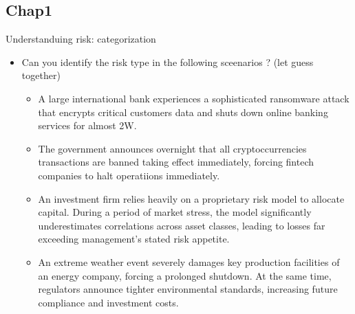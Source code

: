\documentclass[aspectratio=169, 10pt]{beamer} %
\begin{document}
\subsection{Chap1}
\begin{frame}{Understanduing risk: categorization}
    \begin{itemize}

                 \item [$\bullet$] Can you identify the risk type in the following sceenarios ? 
                 (let guess together) 
    \begin{itemize}
        \item [$\bullet$] A large international bank experiences a sophisticated ransomware attack
        that encrypts critical customers data and shuts down online banking services for almost 2W. 
         \medskip 
          \item [$\bullet$] The government announces overnight that all cryptoccurrencies transactions
          are banned taking effect immediately, forcing fintech companies to halt operatiions 
          immediately.  
         \medskip 
          \item [$\bullet$] An investment firm relies heavily on a proprietary risk model to allocate 
          capital. During a period of market stress, the model significantly underestimates correlations 
          across asset classes, leading to losses far exceeding management’s stated risk appetite.
         \medskip 
          \item [$\bullet$] An extreme weather event severely damages key production facilities of an
          energy company, forcing a prolonged shutdown. At the same time, regulators announce tighter
          environmental standards, increasing future compliance and investment costs.
    \end{itemize}

    \end{itemize}
\end{frame}
\end{document}
